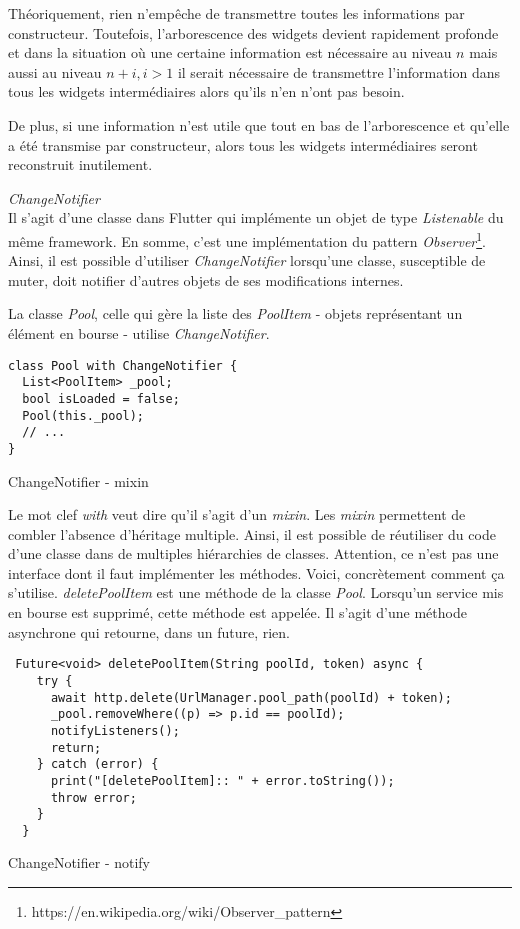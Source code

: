 Théoriquement, rien n'empêche de transmettre toutes les informations par constructeur. Toutefois, l'arborescence des widgets devient rapidement profonde
et dans la situation où une certaine information est nécessaire au niveau \(n\) mais aussi au niveau \(n+i, i > 1\) il serait nécessaire de transmettre l'information
dans tous les widgets intermédiaires alors qu'ils n'en n'ont pas besoin.

De plus, si une information n'est utile que tout en bas de l'arborescence et qu'elle a été transmise par constructeur, alors tous les widgets intermédiaires seront reconstruit inutilement.

\emph{ChangeNotifier}\\
Il s'agit d'une classe dans Flutter qui implémente un objet de type \textit{Listenable} du même framework. En somme, c'est une implémentation du pattern \textit{Observer}\footnote{https://en.wikipedia.org/wiki/Observer\_pattern}. Ainsi, il est possible d'utiliser \textit{ChangeNotifier} lorsqu'une classe, susceptible de muter, doit notifier d'autres objets de ses modifications internes. 

La classe \textit{Pool}, celle qui gère la liste des \textit{PoolItem} - objets représentant un élément en bourse - utilise \textit{ChangeNotifier}.
\begin{listing}[!h]
    \begin{verbatim}
class Pool with ChangeNotifier {
  List<PoolItem> _pool;
  bool isLoaded = false;
  Pool(this._pool);
  // ...
}
\end{verbatim}
\caption{ChangeNotifier - mixin}
\label{code:changeNotifier}
\end{listing}

Le mot clef \textit{with} veut dire qu'il s'agit d'un \textit{mixin}. Les \textit{mixin} permettent de combler l'absence d'héritage multiple. Ainsi, il est possible de réutiliser du code d'une classe dans de multiples hiérarchies de classes. Attention, ce n'est pas une interface dont il faut implémenter les méthodes.
\newpage
Voici, concrètement comment ça s'utilise. \textit{deletePoolItem} est une méthode de la classe \textit{Pool}. Lorsqu'un service mis en bourse est supprimé, cette méthode est appelée. Il s'agit d'une méthode asynchrone qui retourne, dans un future, rien.

\begin{listing}[!h]
\begin{verbatim}
 Future<void> deletePoolItem(String poolId, token) async {
    try {
      await http.delete(UrlManager.pool_path(poolId) + token);
      _pool.removeWhere((p) => p.id == poolId);
      notifyListeners();
      return;
    } catch (error) {
      print("[deletePoolItem]:: " + error.toString());
      throw error;
    }
  }
\end{verbatim}
\caption{ChangeNotifier - notify}
\label{code:changeNotifierNotify}
\end{listing}

